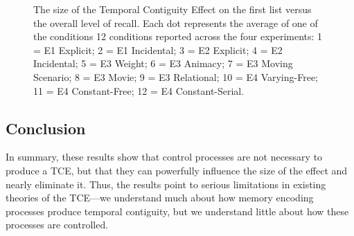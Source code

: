 \documentclass[man,natbib,floatsintext]{apa6} %
\begin{document}
\begin{figure}%
\caption{The size of the Temporal Contiguity Effect on the first list versus the overall level of recall. Each dot represents the average of one of the conditions 12 conditions reported across the four experiments: 1 = E1 Explicit; 2 = E1 Incidental; 3 = E2 Explicit; 4 = E2 Incidental; 5 = E3 Weight; 6 = E3 Animacy; 7 = E3 Moving Scenario; 8 = E3 Movie; 9 = E3 Relational; 10 = E4 Varying-Free; 11 = E4 Constant-Free; 12 = E4 Constant-Serial.}
\label{corr}
\end{figure}

\color{black}


\subsection{Conclusion}
In summary, these results show that control processes are not necessary to produce a TCE, but that they can powerfully influence the size of the effect and nearly eliminate it. Thus, the results point to serious limitations in existing theories of the TCE---we understand much about how memory encoding processes produce temporal contiguity, but we understand little about how these processes are controlled.


\end{document}
